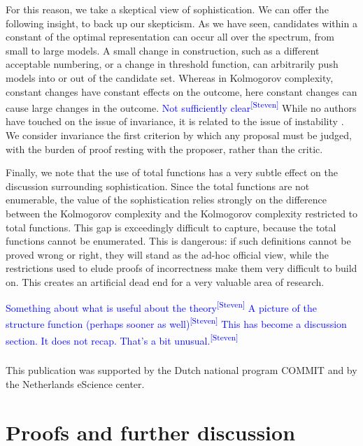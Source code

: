 \documentclass{style/llncs}
\newcommand{\sdr}[1]{\textcolor{blue}{\small #1\textsuperscript{[Steven]} }}
\begin{document}
For this reason, we take a skeptical view of sophistication. We can offer the following insight, to back up our skepticism. As we have seen, candidates within a constant of the optimal representation can occur all over the spectrum, from small to large models. A small change in construction, such as a different acceptable numbering, or a change in threshold function, can arbitrarily push models into or out of the candidate set. Whereas in Kolmogorov complexity, constant changes have constant effects on the outcome, here constant changes can cause large changes in the outcome. \sdr{Not sufficiently clear} While no authors have touched on the issue of invariance, it is related to the issue of instability \cite{antunes2013sophistication,vereshchagin2013algorithmic}. We consider invariance the first criterion by which any proposal must be judged, with the burden of proof resting with the proposer, rather than the critic.

Finally, we note that the use of total functions has a very subtle effect on the discussion surrounding sophistication. Since the total functions are not enumerable, the value of the sophistication relies strongly on the difference between the Kolmogorov complexity and the Kolmogorov complexity restricted to total functions. This gap is exceedingly difficult to capture, because the total functions cannot be enumerated. This is dangerous: if such definitions cannot be proved wrong or right, they will stand as the ad-hoc official view, while the restrictions used to elude proofs of incorrectness make them very difficult to build on. This creates an artificial dead end for a very valuable area of research. 


\sdr{Something about what is useful about the theory}
\sdr{A picture of the structure function (perhaps sooner as well)}
\sdr{This has become a discussion section. It does not recap. That's a bit unusual.}

\subsubsection*{\ackname}

This publication was supported by the Dutch national program COMMIT and by  the Netherlands eScience center.




\appendix

\section{Proofs and further discussion}
\end{document}
